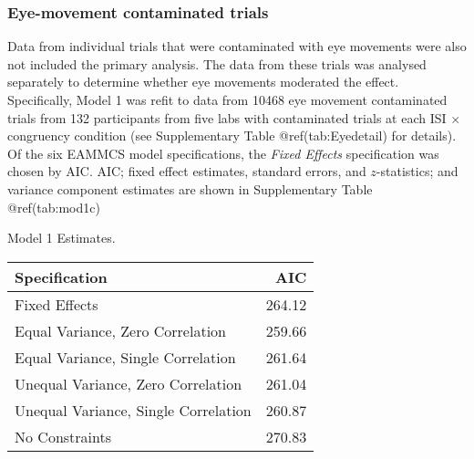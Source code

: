 \begin{appendix}
\subsubsection{Eye-movement contaminated
trials}\label{eye-movement-contaminated-trials}

Data from individual trials that were contaminated with eye movements
were also not included the primary analysis. The data from these trials
was analysed separately to determine whether eye movements moderated the
effect. Specifically, Model 1 was refit to data from 10468 eye movement
contaminated trials from 132 participants from five labs with
contaminated trials at each ISI \(\times\) congruency condition (see
Supplementary Table @ref(tab:Eyedetail) for details). Of the six EAMMCS
model specifications, the \emph{Fixed Effects} specification was chosen
by AIC. AIC; fixed effect estimates, standard errors, and
\(z\)-statistics; and variance component estimates are shown in
Supplementary Table @ref(tab:mod1c)

\begin{table}[!p]
\caption{\label{tab:mod1}Model 1 Estimates.}
\begin{subtable}{\textwidth}
\centering
\begin{table}[H]\centering\begingroup\fontsize{10}{12}\selectfont

\begin{tabular}{lr}
\toprule
Specification & AIC\\
\midrule
Fixed Effects & 264.12\\
Equal Variance, Zero Correlation & 259.66\\
Equal Variance, Single Correlation & 261.64\\
Unequal Variance, Zero Correlation & 261.04\\
Unequal Variance, Single Correlation & 260.87\\
No Constraints & 270.83\\
\bottomrule
\end{tabular}\endgroup{}
\end{table}
\end{subtable}
\begin{subtable}{\textwidth}
\caption{Fixed Effect Estimates}
\centering
\begin{table}[H]\centering\begingroup\fontsize{10}{12}\selectfont


\end{table}
\end{subtable}
\end{table}
\end{appendix}
